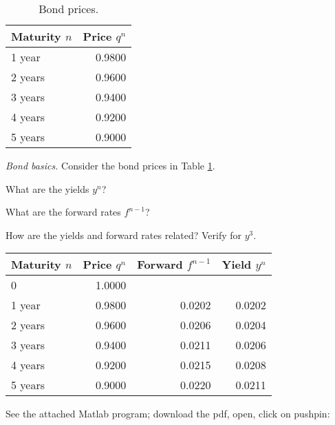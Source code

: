 \documentclass[11pt]{exam}
\begin{document}
\begin{questions}
\begin{solution}
\begin{parts}
\end{parts}
\end{solution}

\begin{table}[h]
\centering
\tabcolsep=0.1in
\begin{tabular}{lr}
\toprule
Maturity $n$   & \phantom{xx} Price $q^n$ \\ %
\midrule
1 year      &    0.9800   \\
2 years     &    0.9600   \\
3 years     &    0.9400   \\
4 years     &    0.9200   \\
5 years     &    0.9000   \\
\bottomrule
\end{tabular}
\caption{Bond prices.}
\label{tab:bonds}
\end{table}

\item {\it Bond basics.\/}
Consider the bond prices in Table \ref{tab:bonds}.
%
\begin{parts}
\item What are the yields $y^n$?
\item What are the forward rates $f^{n-1}$?
\item How are the yields and forward rates related?  Verify for $y^3$.
\end{parts}

\begin{solution}
\begin{center}
\tabcolsep=0.1in
\begin{tabular}{lrrr}
\toprule
Maturity $n$   & \phantom{xx} Price $q^n$ & Forward $f^{n-1}$ & \phantom{xx} Yield $y^n$ \\
\midrule
0           &    1.0000  \\
1 year      &    0.9800  & 0.0202 & 0.0202 \\
2 years     &    0.9600  & 0.0206 & 0.0204 \\
3 years     &    0.9400  & 0.0211 & 0.0206 \\
4 years     &    0.9200  & 0.0215 & 0.0208 \\
5 years     &    0.9000  & 0.0220 & 0.0211 \\
\bottomrule
\end{tabular}
\end{center}
See the attached Matlab program;
download the pdf, open, click on pushpin:


\end{solution}
\end{questions}
\end{document}
